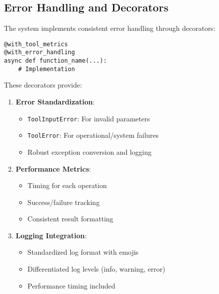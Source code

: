 \documentclass[12pt,a4paper]{article}
\newcommand{\code}[1]{\texttt{#1}}
\begin{document}
\subsection*{Error Handling and Decorators}

The system implements consistent error handling through decorators:
\begin{pageablecode}
\begin{verbatim}
@with_tool_metrics
@with_error_handling
async def function_name(...):
    # Implementation
\end{verbatim}
\end{pageablecode}
These decorators provide:

\begin{enumerate}[label=\arabic*.]
    \item \textbf{Error Standardization}:
    \begin{itemize}
        \item \code{ToolInputError}: For invalid parameters
        \item \code{ToolError}: For operational/system failures
        \item Robust exception conversion and logging
    \end{itemize}
    \item \textbf{Performance Metrics}:
    \begin{itemize}
        \item Timing for each operation
        \item Success/failure tracking
        \item Consistent result formatting
    \end{itemize}
    \item \textbf{Logging Integration}:
    \begin{itemize}
        \item Standardized log format with emojis
        \item Differentiated log levels (info, warning, error)
        \item Performance timing included
    \end{itemize}
\end{enumerate}
\end{document}
